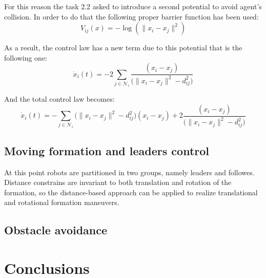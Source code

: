 \documentclass[a4paper,11pt,oneside]{book}
\begin{document}
\bigskip
For this reason the task 2.2 asked to introduce a second potential to avoid agent's collision. In order to do that the following proper barrier function has been used:
\begin{equation}
V_{ij}(x) = - \log( \lVert x_i - x_j \rVert ^2)
\label{Collision_barrier}
\end{equation}

As a result, the control law has a new term due to this potential that is the following one:
\begin{equation}
\dot{x}_i(t) = - 2\sum_{j \in \mathcal{N}_i} \frac{(x_i-x_j)}{\bigg( \lVert x_i - x_j \rVert^2 - d_{ij}^2 \bigg)}
\end{equation}

And the total control law becomes:
\begin{equation}
\dot{x}_i(t) = - \sum_{j \in \mathcal{N}_i} \bigg( \lVert x_i - x_j \rVert^2 - d_{ij}^2 \bigg) (x_i - x_j ) + 2 \frac{(x_i-x_j)}{\bigg( \lVert x_i - x_j \rVert^2 - d_{ij}^2 \bigg)}
\end{equation}



\section{Moving formation and leaders control}
At this point robots are partitioned in two groups, namely leaders and followes.
Distance constrains  are invariant to both translation and rotation of the formation, so the distance-based approach can be applied to realize translational and rotational formation maneuvers. 

\section{Obstacle avoidance}




\chapter*{Conclusions}

{}



\end{document}
